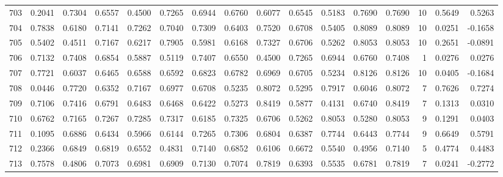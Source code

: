 \begin{tabular}{lrrrrrrrrrrrrrrr}
703 &      0.2041 &  0.7304 &  0.6557 &  0.4500 &  0.7265 &  0.6944 &  0.6760 &  0.6077 &  0.6545 &  0.5183 &   0.7690 &     0.7690 &     10 &                    0.5649 &                     0.5263 \\
704 &      0.7838 &  0.6180 &  0.7141 &  0.7262 &  0.7040 &  0.7309 &  0.6403 &  0.7520 &  0.6708 &  0.5405 &   0.8089 &     0.8089 &     10 &                    0.0251 &                    -0.1658 \\
705 &      0.5402 &  0.4511 &  0.7167 &  0.6217 &  0.7905 &  0.5981 &  0.6168 &  0.7327 &  0.6706 &  0.5262 &   0.8053 &     0.8053 &     10 &                    0.2651 &                    -0.0891 \\
706 &      0.7132 &  0.7408 &  0.6854 &  0.5887 &  0.5119 &  0.7407 &  0.6550 &  0.4500 &  0.7265 &  0.6944 &   0.6760 &     0.7408 &      1 &                    0.0276 &                     0.0276 \\
707 &      0.7721 &  0.6037 &  0.6465 &  0.6588 &  0.6592 &  0.6823 &  0.6782 &  0.6969 &  0.6705 &  0.5234 &   0.8126 &     0.8126 &     10 &                    0.0405 &                    -0.1684 \\
708 &      0.0446 &  0.7720 &  0.6352 &  0.7167 &  0.6977 &  0.6708 &  0.5235 &  0.8072 &  0.5295 &  0.7917 &   0.6046 &     0.8072 &      7 &                    0.7626 &                     0.7274 \\
709 &      0.7106 &  0.7416 &  0.6791 &  0.6483 &  0.6468 &  0.6422 &  0.5273 &  0.8419 &  0.5877 &  0.4131 &   0.6740 &     0.8419 &      7 &                    0.1313 &                     0.0310 \\
710 &      0.6762 &  0.7165 &  0.7267 &  0.7285 &  0.7317 &  0.6185 &  0.7325 &  0.6706 &  0.5262 &  0.8053 &   0.5280 &     0.8053 &      9 &                    0.1291 &                     0.0403 \\
711 &      0.1095 &  0.6886 &  0.6434 &  0.5966 &  0.6144 &  0.7265 &  0.7306 &  0.6804 &  0.6387 &  0.7744 &   0.6443 &     0.7744 &      9 &                    0.6649 &                     0.5791 \\
712 &      0.2366 &  0.6849 &  0.6819 &  0.6552 &  0.4831 &  0.7140 &  0.6852 &  0.6106 &  0.6672 &  0.5540 &   0.4956 &     0.7140 &      5 &                    0.4774 &                     0.4483 \\
713 &      0.7578 &  0.4806 &  0.7073 &  0.6981 &  0.6909 &  0.7130 &  0.7074 &  0.7819 &  0.6393 &  0.5535 &   0.6781 &     0.7819 &      7 &                    0.0241 &                    -0.2772 \\

\end{tabular}
